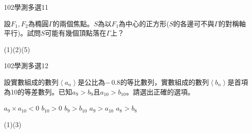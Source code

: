 \begin{QUESTIONS}
\begin{QUESTION}
        \begin{ExamInfo}{102}{學測}{多選}{11}
        \end{ExamInfo}
        \begin{ExamAnsRateInfo}{42}{58}{45}{23}
        \end{ExamAnsRateInfo}
        \begin{QBODY}
            設${{F}_{1}},{{F}_{2}}$為橢圓$\Gamma $的兩個焦點。$S$為以${{F}_{1}}$為中心的正方形($S$的各邊可不與$\Gamma $的對稱軸平行)。試問$S$可能有幾個頂點落在$\Gamma $上？
			\begin{QOPS}
			\end{QOPS}
        \end{QBODY}
        \begin{QFROMS}
        \end{QFROMS}
        \begin{QTAGS}\end{QTAGS}
        \begin{QANS}
            (1)(2)(5)
        \end{QANS}
        \begin{QSOLLIST}
        \end{QSOLLIST}
        \begin{QEMPTYSPACE}
        \end{QEMPTYSPACE}
    \end{QUESTION}
    \begin{QUESTION}
        \begin{ExamInfo}{102}{學測}{多選}{12}
        \end{ExamInfo}
        \begin{ExamAnsRateInfo}{45}{67}{46}{22}
        \end{ExamAnsRateInfo}
        \begin{QBODY}
            設實數組成的數列$\left\langle {{a}_{n}} \right\rangle $是公比為$-\,0.8$的等比數列，實數組成的數列$\left\langle {{b}_{n}} \right\rangle $是首項為10的等差數列。已知${{a}_{9}}>{{b}_{9}}$且${{a}_{10}}>{{b}_{10}}$。請選出正確的選項。
			\begin{QOPS}
				\QOP ${{a}_{9}}\times {{a}_{10}}<0$
				\QOP ${{b}_{10}}>0$
				\QOP ${{b}_{9}}>{{b}_{10}}$
				\QOP ${{a}_{9}}>{{a}_{10}}$
				\QOP ${{a}_{8}}>{{b}_{8}}$
			\end{QOPS}
        \end{QBODY}
        \begin{QFROMS}
        \end{QFROMS}
        \begin{QTAGS}\end{QTAGS}
        \begin{QANS}
            (1)(3)
        \end{QANS}
        \begin{QSOLLIST}
        \end{QSOLLIST}
        \begin{QEMPTYSPACE}
        \end{QEMPTYSPACE}
    \end{QUESTION}
\end{QUESTIONS}

